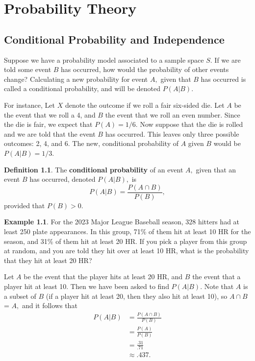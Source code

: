 \documentclass[
]{book}
\theoremstyle{definition}
\newtheorem{definition}{Definition}[chapter]
\theoremstyle{definition}
\newtheorem{example}{Example}[chapter]
\theoremstyle{definition}
\theoremstyle{definition}
\theoremstyle{remark}
\begin{document}
\chapter{Probability Theory}\label{probability-theory}

\section{Conditional Probability and Independence}\label{conditional-probability-and-independence}

Suppose we have a probability model associated to a sample space \(S\). If we are told some event \(B\) has occurred, how would the probability of other events change? Calculating a new probability for event \(A,\) given that \(B\) has occurred is called a conditional probability, and will be denoted \(P(A|B)\).

For instance, Let \(X\) denote the outcome if we roll a fair six-sided die. Let \(A\) be the event that we roll a 4, and \(B\) the event that we roll an even number. Since the die is fair, we expect that \(P(A) = 1/6\). Now suppose that the die is rolled and we are told that the event \(B\) has occurred. This leaves only three possible outcomes: 2, 4, and 6. The new, conditional probability of \(A\) given \(B\) would be \(P(A|B) = 1/3.\)

\begin{definition}
\protect\hypertarget{def:cond-prob}{}\label{def:cond-prob}The \textbf{conditional probability} of an event \(A,\) given that an event \(B\) has occurred, denoted \(P(A|B),\) is
\begin{equation} 
  P(A|B) = \frac{P(A \cap B)}{P(B)},
  \label{eq:condprob}
\end{equation}
provided that \(P(B) > 0\).
\end{definition}

\begin{example}
For the 2023 Major League Baseball season, 328 hitters had at least 250 plate appearances. In this group, 71\% of them hit at least 10 HR for the season, and 31\% of them hit at least 20 HR. If you pick a player from this group at random, and you are told they hit over at least 10 HR, what is the probability that they hit at least 20 HR?

Let \(A\) be the event that the player hits at least 20 HR, and \(B\) the event that a player hit at least 10. Then we have been asked to find \(P(A|B)\). Note that \(A\) is a subset of \(B\) (if a player hit at least 20, then they also hit at least 10), so \(A \cap B\) = \(A,\) and it follows that
\begin{align*}
P(A|B) &= \frac{P(A \cap B)}{P(B)} \\
      &= \frac{P(A)}{P(B)} \\
      &= \frac{.31}{.71}\\
      &\approx .437.
\end{align*}
\end{example}
\end{document}
